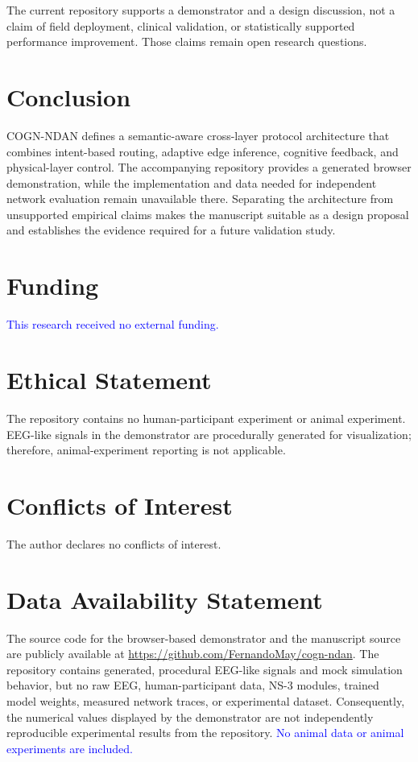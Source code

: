 \documentclass{BVP_CINC}
\newcommand{\added}[1]{\textcolor{blue}{#1}}
\newcommand{\added}[1]{#1}
\begin{document}
The current repository supports a demonstrator and a design discussion, not a claim of field deployment, clinical validation, or statistically supported performance improvement. Those claims remain open research questions.

\section{Conclusion}
COGN-NDAN defines a semantic-aware cross-layer protocol architecture that combines intent-based routing, adaptive edge inference, cognitive feedback, and physical-layer control. The accompanying repository provides a generated browser demonstration, while the implementation and data needed for independent network evaluation remain unavailable there. Separating the architecture from unsupported empirical claims makes the manuscript suitable as a design proposal and establishes the evidence required for a future validation study.

\section*{Funding}
\added{This research received no external funding.}

\section*{Ethical Statement}
The repository contains no human-participant experiment or animal experiment. EEG-like signals in the demonstrator are procedurally generated for visualization; therefore, animal-experiment reporting is not applicable.

\section*{Conflicts of Interest}
The author declares no conflicts of interest.

\section*{Data Availability Statement}
The source code for the browser-based demonstrator and the manuscript source are publicly available at \url{https://github.com/FernandoMay/cogn-ndan}. The repository contains generated, procedural EEG-like signals and mock simulation behavior, but no raw EEG, human-participant data, NS-3 modules, trained model weights, measured network traces, or experimental dataset. Consequently, the numerical values displayed by the demonstrator are not independently reproducible experimental results from the repository. \added{No animal data or animal experiments are included.}
\end{document}
